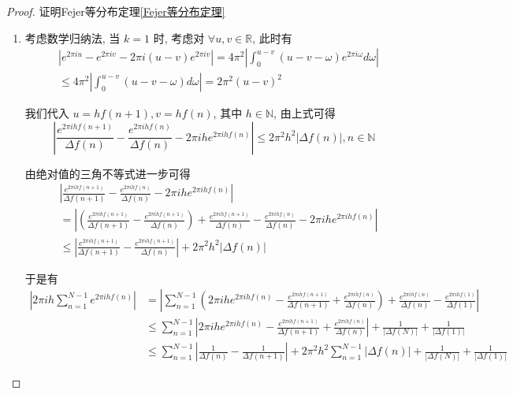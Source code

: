 \begin{proof}{证明Fejer等分布定理\cref{Fejer等分布定理}}
    \begin{enumerate}
        \item 考虑数学归纳法, 当 $k=1$ 时, 考虑对 $\forall u, v \in \mathbb{R}$, 此时有
              $$
                  \begin{aligned}
                       & \left|e^{2 \pi i u}-e^{2 \pi i v}-2 \pi i(u-v) e^{2 \pi i v}\right|=4 \pi^2\left|\int_0^{u-v}(u-v-\omega) e^{2 \pi i \omega} d \omega\right| \\
                       & \leq 4 \pi^2\left|\int_0^{u-v}(u-v-\omega) d \omega\right|=2 \pi^2(u-v)^2
                  \end{aligned}
              $$

              我们代入 $u=h f(n+1), v=h f(n)$, 其中 $h \in \mathbb{N}$, 由上式可得
              $$
                  \left|\frac{e^{2 \pi i h f(n+1)}}{\Delta f(n)}-\frac{e^{2 \pi i h f(n)}}{\Delta f(n)}-2 \pi i h e^{2 \pi i h f(n)}\right| \leq 2 \pi^2 h^2|\Delta f(n)|, n \in \mathbb{N}
              $$

              由绝对值的三角不等式进一步可得
              $$
                  \begin{aligned}
                       & \left|\frac{e^{2 \pi i h f(n+1)}}{\Delta f(n+1)}-\frac{e^{2 \pi i h f(n)}}{\Delta f(n)}-2 \pi i h e^{2 \pi i h f(n)}\right|                                                                                                 \\
                       & =\left|\left(\frac{e^{2 \pi i h f(n+1)}}{\Delta f(n+1)}-\frac{e^{2 \pi i h f(n+1)}}{\Delta f(n)}\right)+\frac{e^{2 \pi i h f(n+1)}}{\Delta f(n)}-\frac{e^{2 \pi i h f(n)}}{\Delta f(n)}-2 \pi i h e^{2 \pi i h f(n)}\right| \\
                       & \leq\left|\frac{e^{2 \pi i h f(n+1)}}{\Delta f(n+1)}-\frac{e^{2 \pi i h f(n+1)}}{\Delta f(n)}\right|+2 \pi^2 h^2|\Delta f(n)|
                  \end{aligned}
              $$

              于是有
              $$
                  \begin{aligned}
                      \left|2 \pi i h \sum_{n=1}^{N-1} e^{2 \pi i h f(n)}\right| & =\left|\sum_{n=1}^{N-1}\left(2 \pi i h e^{2 \pi i h f(n)}-\frac{e^{2 \pi i h f(n+1)}}{\Delta f(n+1)}+\frac{e^{2 \pi i h f(n)}}{\Delta f(n)}\right)+\frac{e^{2 \pi i h f(n)}}{\Delta f(n)}-\frac{e^{2 \pi i h f(1)}}{\Delta f(1)}\right| \\
                                                                                 & \leq \sum_{n=1}^{N-1}\left|2 \pi i h e^{2 \pi i h f(n)}-\frac{e^{2 \pi i h f(n+1)}}{\Delta f(n+1)}+\frac{e^{2 \pi i h f(n)}}{\Delta f(n)}\right|+\frac{1}{|\Delta f(N)|}+\frac{1}{|\Delta f(1)|}                                        \\
                                                                                 & \leq \sum_{n=1}^{N-1}\left|\frac{1}{\Delta f(n)}-\frac{1}{\Delta f(n+1)}\right|+2 \pi^2 h^2 \sum_{n=1}^{N-1}|\Delta f(n)|+\frac{1}{|\Delta f(N)|}+\frac{1}{|\Delta f(1)|}
                  \end{aligned}
              $$


\end{enumerate}
\end{proof}
